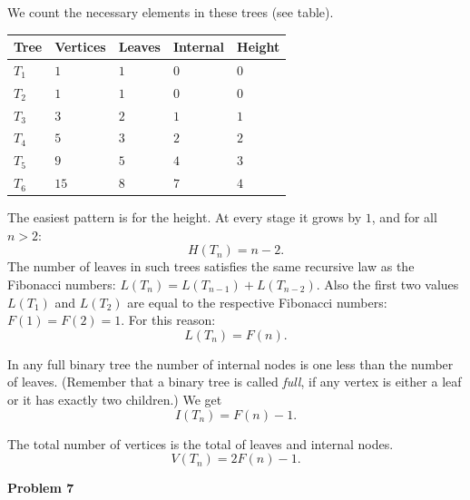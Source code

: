 \documentclass[jou]{apa6}
\begin{document}
We count the necessary elements in these trees (see table).

\begin{tabular}{|l|l|l|l|l|} \hline
Tree & Vertices & Leaves & Internal & Height \\ \hline
$T_1$ & $1$ & $1$ & $0$ & $0$ \\ \hline
$T_2$ & $1$ & $1$ & $0$ & $0$ \\ \hline
$T_3$ & $3$ & $2$ & $1$ & $1$ \\ \hline
$T_4$ & $5$ & $3$ & $2$ & $2$ \\ \hline
$T_5$ & $9$ & $5$ & $4$ & $3$ \\ \hline
$T_6$ & $15$ & $8$ & $7$ & $4$ \\ \hline
\end{tabular}

The easiest pattern is for the height. At every stage it grows by $1$, and for all $n > 2$: 
\begin{equation}
H(T_n) = n-2.
\end{equation}
The number of leaves in such trees satisfies the same recursive law
as the Fibonacci numbers: $L(T_{n}) = L(T_{n-1}) + L(T_{n-2})$. 
Also the first two values $L(T_1)$ and $L(T_2)$ are equal to the respective
Fibonacci numbers: $F(1) = F(2) = 1$. For this reason: 
\begin{equation}
L(T_n) = F(n).
\end{equation}

In any full binary tree the number of internal nodes is one less
than the number of leaves.
(Remember that a binary tree is called {\em full}, if any vertex is either a leaf or 
it has exactly two children.) We get 
\begin{equation}
I(T_n) = F(n) -1.
\end{equation}

The total number of vertices is the total of leaves and internal nodes. 
\begin{equation}
V(T_n) = 2F(n)-1.
\end{equation}











\vspace{6pt}
{\bf Problem 7}
\end{document}
